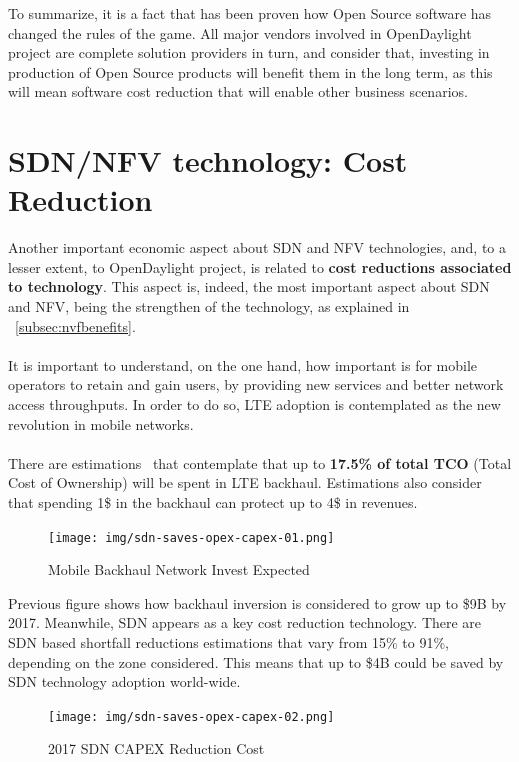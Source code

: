 \documentclass[a4paper, 12pt]{book}
\begin{document}
To summarize, it is a fact that has been proven how Open Source software has changed the rules of the game. All major vendors involved in OpenDaylight project are complete solution providers in turn, and consider that, investing in production of Open Source products will benefit them in the long term, as this will mean software cost reduction that will enable other business scenarios.

\section{SDN/NFV technology: Cost Reduction}
\label{sec:sdnnfvcostreduction}
Another important economic aspect about SDN and NFV technologies, and, to a lesser extent, to OpenDaylight project, is related to \textbf{cost reductions associated to technology}. This aspect is, indeed, the most important aspect about SDN and NFV, being the strengthen of the technology, as explained in ~\ref{subsec:nvfbenefits}.\\
\\
It is important to understand, on the one hand, how important is for mobile operators to retain and gain users, by providing new services and better network access throughputs. In order to do so, LTE adoption is contemplated as the new revolution in mobile networks.\\
\\
There are estimations~\cite{SDNsaves4B} that contemplate that up to \textbf{17.5\% of total TCO} (Total Cost of Ownership) will be spent in LTE backhaul. Estimations also consider that spending 1\$ in the backhaul can protect up to 4\$ in revenues.
\begin{center}
 \begin{figure}[H]
 \begin{center}
   \texttt{[image: img/sdn-saves-opex-capex-01.png]}
   \caption{Mobile Backhaul Network Invest Expected}
   \label{fig:LTE Investment}
 \end{center}
 \end{figure}
\end{center}
Previous figure shows how backhaul inversion is considered to grow up to \$9B by 2017. Meanwhile, SDN appears as a key cost reduction technology. There are SDN based shortfall reductions estimations that vary from 15\% to 91\%, depending on the zone considered. This means that up to \$4B could be saved by SDN technology adoption world-wide.
\begin{center}
 \begin{figure}[H]
 \begin{center}
   \texttt{[image: img/sdn-saves-opex-capex-02.png]}
   \caption{2017 SDN CAPEX Reduction Cost}
   \label{fig:sdncapexreduction}
 \end{center}
 \end{figure}
\end{center}
\end{document}
